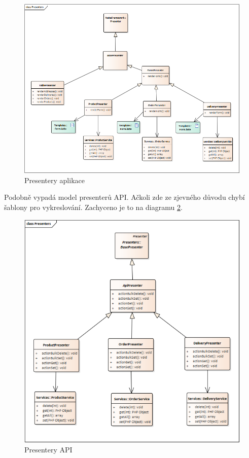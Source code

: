 \documentclass[thesis=B,czech]{FITthesis}[2012/06/26]
\begin{document}
\begin{figure}
	\includegraphics[width=\textwidth]{server_side_presenters.png}
	\caption{Presentery aplikace}\label{server_side_presenters}
\end{figure}	
	
	Podobně vypadá model presenterů API. Ačkoli zde ze zjevného důvodu chybí šablony pro vykreslování. Zachyceno je to na diagramu \ref{api_presenters}.

\begin{figure}
	\includegraphics[width=\textwidth]{api_presenters.png}
	\caption{Presentery API}\label{api_presenters}
\end{figure}	
\end{document}
